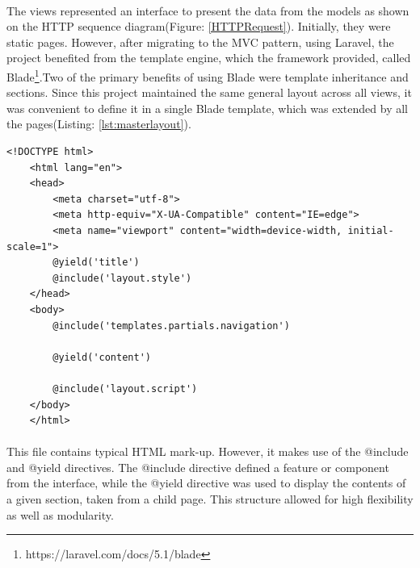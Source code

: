 \documentclass{l4proj}
\begin{document}
\paragraph{}
The views represented an interface to present the data from the models as shown on the HTTP sequence diagram(Figure: \ref{HTTPRequest}). Initially, they were static pages. However, after migrating to the MVC pattern, using Laravel, the project benefited from the template engine, which the framework provided, called Blade\footnote{https://laravel.com/docs/5.1/blade}.Two of the primary benefits of using Blade were template inheritance and sections. Since this project maintained the same general layout across all views, it was convenient to define it in a single Blade template, which was extended by all the pages(Listing: \ref{lst:masterlayout}).
\begin{lstlisting}[caption={Master layout},label={lst:masterlayout}]
	<!DOCTYPE html>
	<html lang="en">
	<head>
		<meta charset="utf-8">
		<meta http-equiv="X-UA-Compatible" content="IE=edge">
		<meta name="viewport" content="width=device-width, initial-scale=1">
		@yield('title')
		@include('layout.style')
	</head>
	<body>
		@include('templates.partials.navigation')
	
		@yield('content')
		
		@include('layout.script')
	</body>
	</html>
\end{lstlisting}
\paragraph{}
This file contains typical HTML mark-up. However, it makes use of the @include and @yield directives. The @include directive defined a feature or component from the interface, while the @yield directive was used to display the contents of a given section, taken from a child page. This structure allowed for high flexibility as well as modularity. 
\end{document}
